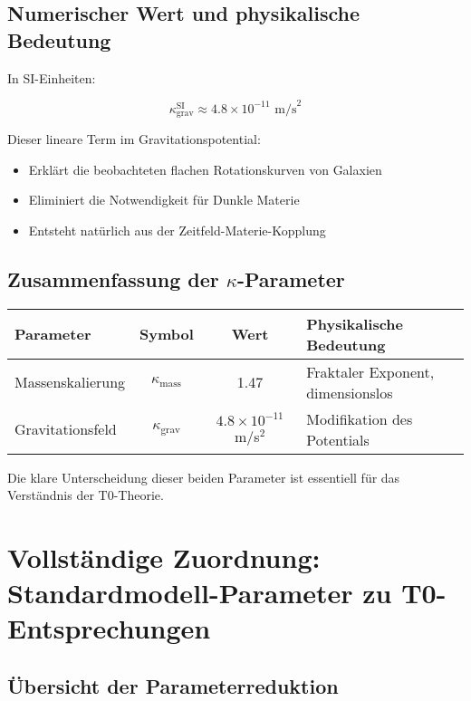 \documentclass[12pt,a4paper]{article}
\theoremstyle{definition}
\begin{document}
	\subsection{Numerischer Wert und physikalische Bedeutung}
	
	In SI-Einheiten:
	
	\begin{equation}
		\kappa_{\text{grav}}^{\text{SI}} \approx 4.8 \times 10^{-11} \text{ m/s}^2
	\end{equation}
	
	Dieser lineare Term im Gravitationspotential:
	\begin{itemize}
		\item Erkl\"art die beobachteten flachen Rotationskurven von Galaxien
		\item Eliminiert die Notwendigkeit f\"ur Dunkle Materie
		\item Entsteht nat\"urlich aus der Zeitfeld-Materie-Kopplung
	\end{itemize}
	
	\subsection{Zusammenfassung der $\kappa$-Parameter}
	
	\begin{center}
		\begin{tabular}{|l|c|c|l|}
			\hline
			\textbf{Parameter} & \textbf{Symbol} & \textbf{Wert} & \textbf{Physikalische Bedeutung} \\
			\hline
			Massenskalierung & $\kappa_{\text{mass}}$ & 1.47 & Fraktaler Exponent, dimensionslos \\
			Gravitationsfeld & $\kappa_{\text{grav}}$ & $4.8 \times 10^{-11}$ m/s$^2$ & Modifikation des Potentials \\
			\hline
		\end{tabular}
	\end{center}
	
	Die klare Unterscheidung dieser beiden Parameter ist essentiell f\"ur das Verst\"andnis der T0-Theorie.
\section{Vollständige Zuordnung: Standardmodell-Parameter zu T0-Entsprechungen}
\label{sec:sm_t0_mapping}

\subsection{Übersicht der Parameterreduktion}
\label{subsec:parameter_overview}
\end{document}

